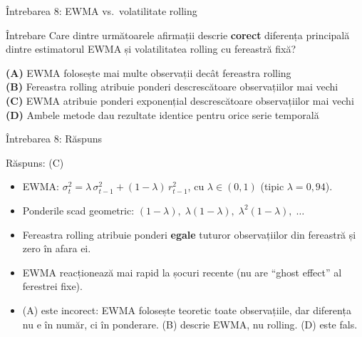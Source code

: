 \documentclass[9pt, aspectratio=169, t]{beamer}
\theoremstyle{definition}
\newenvironment{cminipage}[1]{%
    \par\noindent\hfill\begin{minipage}{#1}\ignorespaces
}{%
    \end{minipage}\hfill\null\par
}
\begin{document}
\begin{frame}{Întrebarea 8: EWMA vs.\ volatilitate rolling}
    \begin{cminipage}{0.95\textwidth}
    \begin{block}{Întrebare}
    Care dintre următoarele afirmații descrie \textbf{corect} diferența principală dintre
    estimatorul EWMA și volatilitatea rolling cu fereastră fixă?
    \end{block}

    \vspace{0.2cm}
    \textcolor{MainBlue}{\textbf{(A)}} EWMA folosește mai multe observații decât fereastra rolling\\[6pt]
    \textcolor{MainBlue}{\textbf{(B)}} Fereastra rolling atribuie ponderi descrescătoare observațiilor mai vechi\\[6pt]
    \textcolor{MainBlue}{\textbf{(C)}} EWMA atribuie ponderi exponențial descrescătoare observațiilor mai vechi\\[6pt]
    \textcolor{MainBlue}{\textbf{(D)}} Ambele metode dau rezultate identice pentru orice serie temporală
    \end{cminipage}
\end{frame}

\begin{frame}{Întrebarea 8: Răspuns}
    \begin{cminipage}{0.95\textwidth}
    \begin{exampleblock}{Răspuns: (C)}
    \begin{itemize}
        \item EWMA: $\sigma_t^2 = \lambda\,\sigma_{t-1}^2 + (1-\lambda)\,r_{t-1}^2$, cu $\lambda \in (0,1)$ (tipic $\lambda = 0{,}94$).
        \item Ponderile scad geometric: $(1-\lambda),\; \lambda(1-\lambda),\; \lambda^2(1-\lambda),\; \ldots$
        \item Fereastra rolling atribuie ponderi \textbf{egale} tuturor observațiilor din fereastră și zero în afara ei.
        \item EWMA reacționează mai rapid la șocuri recente (nu are ``ghost effect'' al ferestrei fixe).
        \item (A) este incorect: EWMA folosește teoretic toate observațiile, dar diferența nu e în număr, ci în ponderare. (B) descrie EWMA, nu rolling. (D) este fals.
    \end{itemize}
    \end{exampleblock}
    \end{cminipage}
\end{frame}
\end{document}
